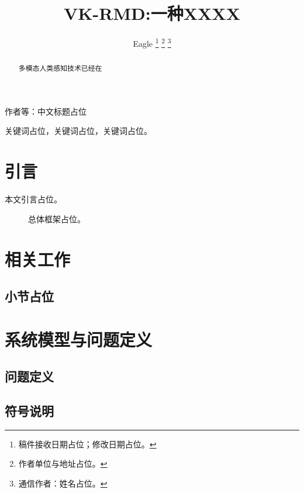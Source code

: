 \documentclass[journal]{IEEEtran}
\begin{document}
\title{VK-RMD:一种XXXX}

\author{Eagle%
\thanks{稿件接收日期占位；修改日期占位。}
\thanks{作者单位与地址占位。}
\thanks{通信作者：姓名占位。}}

%
{作者等：中文标题占位}

\maketitle

\begin{abstract}
多模态人类感知技术已经在
\end{abstract}

\begin{IEEEkeywords}
关键词占位，关键词占位，关键词占位。
\end{IEEEkeywords}

\section{引言}
本文引言占位。

\begin{figure}[!t]
    \centering
    \caption{总体框架占位。}
    \label{fig:framework}
\end{figure}

\section{相关工作}

\subsection{小节占位}

\section{系统模型与问题定义}

\subsection{问题定义}

\subsection{符号说明}
\end{document}
